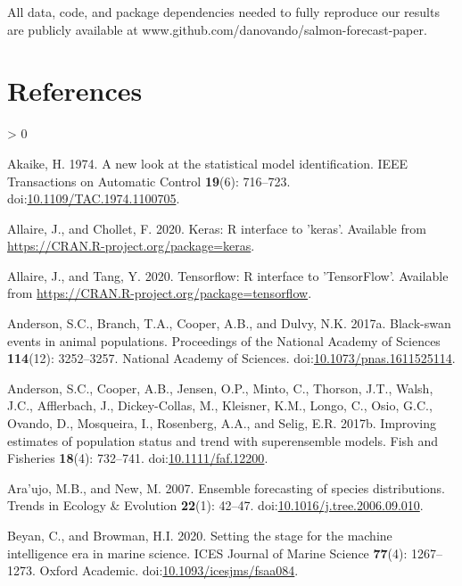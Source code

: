 \documentclass[
]{article}
\newlength{\cslhangindent}
\newenvironment{CSLReferences}[2] %
 {%
  \setlength{\parindent}{0pt}
  \ifodd #1 \everypar{\setlength{\hangindent}{\cslhangindent}}\ignorespaces\fi
  \ifnum #2 > 0
  \setlength{\parskip}{#2\baselineskip}
  \fi
 }%
 {}
\begin{document}
All data, code, and package dependencies needed to fully reproduce our results are publicly available at www.github.com/danovando/salmon-forecast-paper.

\hypertarget{references}{%
\section{References}\label{references}}

\hypertarget{refs}{}
\begin{CSLReferences}{1}{0}
\leavevmode\hypertarget{ref-akaike1974}{}%
Akaike, H. 1974. A new look at the statistical model identification. IEEE Transactions on Automatic Control \textbf{19}(6): 716--723. doi:\href{https://doi.org/10.1109/TAC.1974.1100705}{10.1109/TAC.1974.1100705}.

\leavevmode\hypertarget{ref-allaire2020a}{}%
Allaire, J., and Chollet, F. 2020. Keras: R interface to 'keras'. Available from \url{https://CRAN.R-project.org/package=keras}.

\leavevmode\hypertarget{ref-allaire2020}{}%
Allaire, J., and Tang, Y. 2020. Tensorflow: R interface to 'TensorFlow'. Available from \url{https://CRAN.R-project.org/package=tensorflow}.

\leavevmode\hypertarget{ref-anderson2017c}{}%
Anderson, S.C., Branch, T.A., Cooper, A.B., and Dulvy, N.K. 2017a. Black-swan events in animal populations. Proceedings of the National Academy of Sciences \textbf{114}(12): 3252--3257. {National Academy of Sciences}. doi:\href{https://doi.org/10.1073/pnas.1611525114}{10.1073/pnas.1611525114}.

\leavevmode\hypertarget{ref-anderson2017a}{}%
Anderson, S.C., Cooper, A.B., Jensen, O.P., Minto, C., Thorson, J.T., Walsh, J.C., Afflerbach, J., Dickey-Collas, M., Kleisner, K.M., Longo, C., Osio, G.C., Ovando, D., Mosqueira, I., Rosenberg, A.A., and Selig, E.R. 2017b. Improving estimates of population status and trend with superensemble models. Fish and Fisheries \textbf{18}(4): 732--741. doi:\href{https://doi.org/10.1111/faf.12200}{10.1111/faf.12200}.

\leavevmode\hypertarget{ref-araujo2007}{}%
Ara'ujo, M.B., and New, M. 2007. Ensemble forecasting of species distributions. Trends in Ecology \& Evolution \textbf{22}(1): 42--47. doi:\href{https://doi.org/10.1016/j.tree.2006.09.010}{10.1016/j.tree.2006.09.010}.

\leavevmode\hypertarget{ref-beyan2020}{}%
Beyan, C., and Browman, H.I. 2020. Setting the stage for the machine intelligence era in marine science. ICES Journal of Marine Science \textbf{77}(4): 1267--1273. {Oxford Academic}. doi:\href{https://doi.org/10.1093/icesjms/fsaa084}{10.1093/icesjms/fsaa084}.


\end{CSLReferences}
\end{document}
